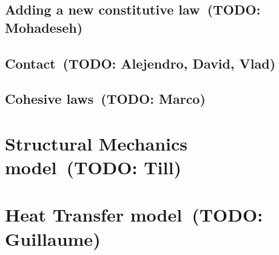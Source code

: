 \documentclass[a4paper,11pt]{book}
\newcommand{\todo}[1]{~({\small\color{red}\textbf{TODO: }\textbf{#1}})}
\begin{document}
\subsection{Adding a new constitutive law\todo{Mohadeseh}}

\subsection{Contact\todo{Alejendro, David, Vlad}}

\subsection{Cohesive laws\todo{Marco}}


\section{Structural Mechanics model\todo{Till}}

\section{Heat Transfer model\todo{Guillaume}}


\end{document}
